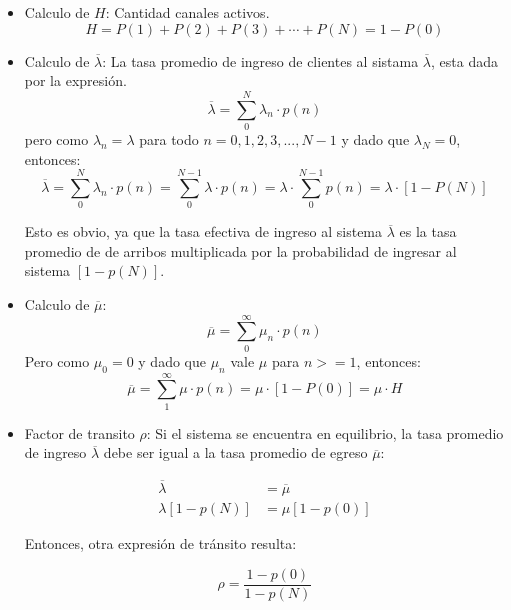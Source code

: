 \documentclass{article}
\begin{document}
\begin{itemize}
    \item Calculo de \(H\): Cantidad canales activos.
        \begin{equation} \label{eu_eqn}
            H = P(1) + P(2) + P(3) + \cdots + P(N) = 1 - P(0)
        \end{equation}
    \item Calculo de \(\overline{\lambda}\): La tasa promedio de ingreso de clientes al sistama \(\overline{\lambda}\), esta dada por la expresión.
        \[
            \overline{\lambda} = \sum_{0}^{N}\lambda_n \cdot p(n) 
        \]
        pero como \(\lambda_n = \lambda\) para todo \(n=0,1,2,3,...,N-1\) y dado que \(\lambda_N=0\), entonces:
        \begin{equation} \label{eu_eqn}
            \overline{\lambda} = \sum_{0}^{N}\lambda_n \cdot p(n) = \sum_{0}^{N-1}\lambda \cdot p(n) = \lambda \cdot \sum_{0}^{N-1}p(n) = \lambda \cdot [1-P(N)]
        \end{equation} 
        
        Esto es obvio, ya que la tasa efectiva de ingreso al sistema \(\overline{\lambda}\) es la tasa promedio de 
        de arribos multiplicada por la probabilidad de ingresar al sistema \([1-p(N)]\).
    \item Calculo de \(\overline{\mu}\): 
        \[
            \overline{\mu} = \sum_{0}^{\infty}\mu_n \cdot p(n) 
        \]
        Pero como \(\mu_0=0\) y dado que \(\mu_n\) vale \(\mu\) para \(n>=1\), entonces:
        \begin{equation} \label{eu_eqn}
            \overline{\mu} = \sum_{1}^{\infty}\mu \cdot p(n) = \mu \cdot [1-P(0)] = \mu \cdot H
        \end{equation}  
    \item Factor de transito \(\rho\): Si el sistema se encuentra en equilibrio, la tasa promedio 
    de ingreso  \(\overline{\lambda}\) debe ser igual a la tasa promedio de egreso \(\overline{\mu}\):

    \begin{align*}
        \overline{\lambda}&=\overline{\mu} \\
        \lambda [1-p(N)] &= \mu [1-p(0)]
    \end{align*}
        
    Entonces, otra expresión de tránsito resulta:

    \[
        \rho = \frac{1-p(0)}{1-p(N)}
    \]
    

\end{itemize}
\end{document}

